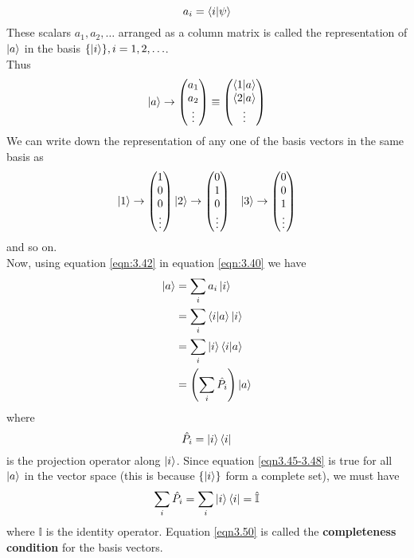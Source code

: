 \begin{equation}\label{eqn3.42}
a_i = \braket{i}{\psi}
\end{equation}
These scalars $a_1, a_2, \ldots$ arranged as a column matrix is called the representation of $\ket{a}$ in the basis $\{\ket{i} \}, i=1,2,\ldots$.\\
Thus
\begin{equation}\label{eqn3.43}
\ket{a} \rightarrow \left(
\begin{matrix}
a_1 \\ a_2 \\ \vdots
\end{matrix}
\right) \equiv \left(
\begin{matrix}
\braket{1}{a} \\ \braket{2}{a} \\ \vdots
\end{matrix}
\right)
\end{equation}
We can write down the representation of any one of the basis vectors in the same basis as
\begin{eqnarray}\label{eqn3.44}
\ket{1} \rightarrow \left(
\begin{matrix}
1 \\ 0 \\ 0 \\ \vdots
\end{matrix}
\right)
&
\ket{2} \rightarrow \left(
\begin{matrix}
0 \\ 1 \\ 0 \\ \vdots
\end{matrix}
\right)
&
\ket{3} \rightarrow \left(
\begin{matrix}
0 \\ 0 \\ 1 \\ \vdots
\end{matrix}
\right)
\end{eqnarray}
and so on.\\
Now, using equation \ref{eqn:3.42} in equation \ref{eqn:3.40} we have
\begin{align}\label{eqn3.45-3.48}
	\ket{a} &= \sum_{i} a_i \ket{i} \\
	&= \sum_{i} \braket{i}{a} \ket{i} \\
	&= \sum_{i} \ket{i}\braket{i}{a}\\
	&= \left(\sum_{i} \hat{P_i}\right)\ket{a}
\end{align}
where
\begin{equation}\label{eqn3.49}
\hat{P_i} = \ket{i}\bra{i}
\end{equation}
is the projection operator along $\ket{i}$. Since equation \ref{eqn3.45-3.48} is true for all $\ket{a}$ in the vector space (this is because $\{\ket{i}\}$ form a complete set), we must have
\begin{equation}\label{eqn3.50}
\sum_{i} \hat{P_i} = \sum_{i}\ket{i} \bra{i} = \hat{\mathbb{I}}
\end{equation}
where $\mathbb{I}$ is the identity operator. Equation \ref{eqn3.50} is called the \textbf{completeness condition} for the basis vectors.


